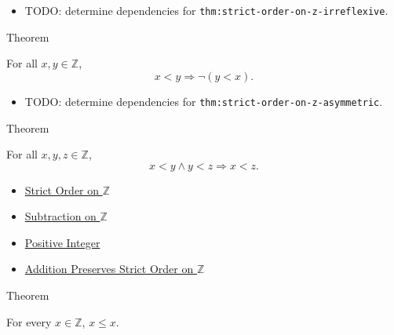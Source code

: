 \begin{dependencies}
\begin{itemize}
  \item TODO: determine dependencies for \texttt{thm:strict-order-on-z-irreflexive}.
\end{itemize}
\end{dependencies}

\begin{theorembox}{Theorem}
\begin{theorem}
\label{thm:strict-order-on-z-asymmetric}
For all $x,y\in\mathbb{Z}$,
\[
x<y \Longrightarrow \neg(y<x).
\]
\end{theorem}
\end{theorembox}

\begin{dependencies}
\begin{itemize}
  \item TODO: determine dependencies for \texttt{thm:strict-order-on-z-asymmetric}.
\end{itemize}
\end{dependencies}

\begin{theorembox}{Theorem}
\begin{theorem}
\label{thm:strict-order-on-z-transitive}
For all $x,y,z\in\mathbb{Z}$,
\[
x<y\land y<z \Longrightarrow x<z.
\]
\end{theorem}
\end{theorembox}

\begin{dependencies}
\begin{itemize}
  \item \hyperref[def:strict-order-on-z]{Strict Order on $\mathbb{Z}$}
  \item \hyperref[def:subtraction-on-z]{Subtraction on $\mathbb{Z}$}
  \item \hyperref[def:positive-integer]{Positive Integer}
  \item \hyperref[thm:addition-preserves-strict-order-on-z]{Addition Preserves Strict Order on $\mathbb{Z}$}
\end{itemize}
\end{dependencies}

\begin{theorembox}{Theorem}
\begin{theorem}
\label{thm:order-on-z-reflexive}
For every $x\in\mathbb{Z}$, $x\le x$.
\end{theorem}
\end{theorembox}

